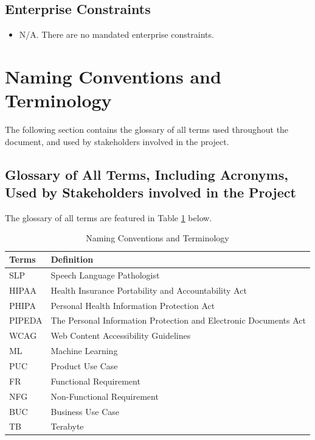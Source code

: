 \documentclass[12pt]{article}
\begin{document}
\subsection{Enterprise Constraints}
\begin{itemize}
  \item[3.8.1] N/A. There are no mandated enterprise constraints.
\end{itemize}

\newpage

\section{Naming Conventions and Terminology}
\hspace{2em}The following section contains the glossary of all terms used throughout the document, and used by stakeholders involved in the project.

\subsection{Glossary of All Terms, Including Acronyms, Used by Stakeholders
involved in the Project}
\hspace{2em}The glossary of all terms are featured in Table \ref{tab:glossary} below.

\begin{table}[h!]
  \caption{Naming Conventions and Terminology}
  \label{tab:glossary}
\begin{tabularx}{\textwidth}{p{2cm}X}
  \toprule {\textbf{Terms}} & {\textbf{Definition}}\\
  \midrule
  SLP & Speech Language Pathologist\\
  HIPAA & Health Insurance Portability and Accountability Act \cite{hipaa}\\
  PHIPA & Personal Health Information Protection Act \cite{phipa}\\
  PIPEDA & The Personal Information Protection and Electronic Documents Act \cite{pipeda}\\
  WCAG & Web Content Accessibility Guidelines \cite{wcag}\\
  ML & Machine Learning\\
  PUC & Product Use Case\\
  FR & Functional Requirement\\
  NFG & Non-Functional Requirement\\
  BUC & Business Use Case\\
  TB & Terabyte\\
  \bottomrule
\end{tabularx}
\end{table}
\end{document}
